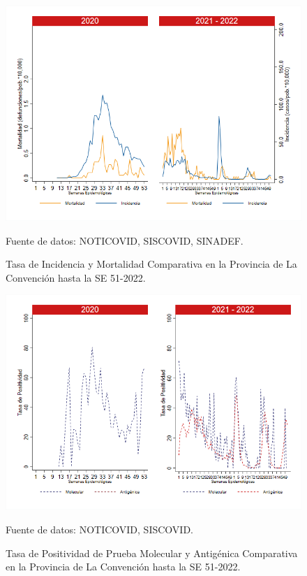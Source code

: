 \documentclass[12pt,a4paper,openany]{book}
\begin{document}
	\begin{figure}[h]
		\caption{Tasa de Incidencia y Mortalidad Comparativa en la Provincia de La Convención hasta la SE 51-2022.}\label{fig:inc_mort_laconv}
		\begin{center}
			\includegraphics[width=0.85\linewidth]{../figuras/incidencia_mortalidad_20_21_9.png}
		\end{center}
		{\footnotesize {Fuente de datos: NOTICOVID, SISCOVID, SINADEF.}}
	\end{figure}
	
	\begin{figure}[h]
		\caption{Tasa de Positividad de Prueba Molecular y Antigénica Comparativa en la Provincia de La Convención hasta la SE 51-2022.}\label{fig:positividad_laconv}
		\begin{center}
			\includegraphics[width=0.7\linewidth]{../figuras/positividad_20_21_9.png}
		\end{center}
		{\footnotesize {Fuente de datos: NOTICOVID, SISCOVID.}}
	\end{figure}
	
\end{document}
